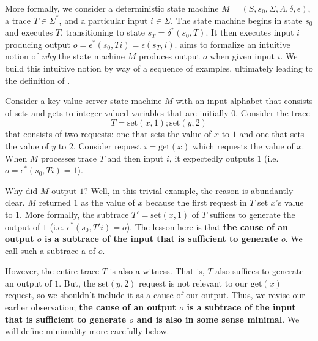More formally, we consider a deterministic state machine $M = (S, s_0, \Sigma,
\Lambda, \delta, \epsilon)$, a trace $T \in \Sigma^*$, and a particular input
$i \in \Sigma$. The state machine begins in state $s_0$ and executes $T$,
transitioning to state $s_T = \delta^*(s_0, T)$. It then executes input $i$
producing output $o = \epsilon^*(s_0, Ti) = \epsilon(s_T, i)$. \Watprovenance{}
aims to formalize an intuitive notion of \emph{why} the state machine $M$
produces output $o$ when given input $i$. We build this intuitive notion by way
of a sequence of examples, ultimately leading to the definition of
\watprovenance{}.

\begin{example}
  \newcommand{\kvset}{\text{set}}
  \newcommand{\kvget}{\text{get}}
  Consider a key-value server state machine $M$ with an input alphabet that
  consists of sets and gets to integer-valued variables that are initially $0$.
  Consider the trace
  \[
    T = \kvset(x, 1); \kvset(y, 2)
  \]
  that consists of two requests: one that sets the value of $x$ to $1$ and one
  that sets the value of $y$ to $2$. Consider request $i = \kvget(x)$ which
  requests the value of $x$. When $M$ processes trace $T$ and then input $i$,
  it expectedly outputs $1$ (i.e.\ $o = \epsilon^*(s_0, Ti) = 1$).

  Why did $M$ output $1$? Well, in this trivial example, the reason is
  abundantly clear. $M$ returned $1$ as the value of $x$ because the first
  request in $T$ set $x$'s value to $1$. More formally, the subtrace $T' =
  \kvset(x, 1)$ of $T$ suffices to generate the output of $1$ (i.e.
  $\epsilon^*(s_0, T'i) = o$). The lesson here is that \textbf{the cause of an
  output $o$ is a subtrace of the input that is sufficient to generate $o$}. We
  call such a subtrace a  of $o$.

  However, the entire trace $T$ is also a witness. That is, $T$ also suffices
  to generate an output of $1$. But, the $\kvset(y, 2)$ request is not relevant
  to our $\kvget(x)$ request, so we shouldn't include it as a cause of our
  output. Thus, we revise our earlier observation; \textbf{the cause of an
  output $o$ is a subtrace of the input that is sufficient to generate $o$ and
  is also in some sense minimal}. We will define minimality more carefully
  below.
\end{example}

